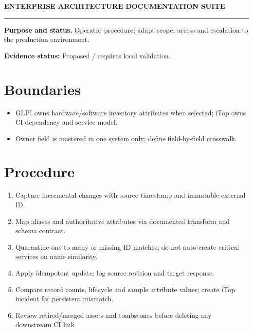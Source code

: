 \documentclass[10pt,letterpaper]{article}
\begin{document}
\begin{center}
{\large\bfseries\color{teal} ENTERPRISE ARCHITECTURE DOCUMENTATION SUITE}\par
{}\par
{}\par
\end{center}
\vspace{8pt}\hrule\vspace{12pt}
\textbf{Purpose and status.} Operator procedure; adapt scope, access and escalation to the production environment.\par
\textbf{Evidence status:} Proposed / requires local validation.\par
\section{Boundaries}
\begin{itemize}
\item GLPI owns hardware/software inventory attributes when selected; iTop owns CI dependency and service model.
\item Owner field is mastered in one system only; define field-by-field crosswalk.
\end{itemize}
\section{Procedure}
\begin{enumerate}
\item Capture incremental changes with source timestamp and immutable external ID.
\item Map aliases and authoritative attributes via documented transform and schema contract.
\item Quarantine one-to-many or missing-ID matches; do not auto-create critical services on name similarity.
\item Apply idempotent update; log source revision and target response.
\item Compare record counts, lifecycle and sample attribute values; create iTop incident for persistent mismatch.
\item Review retired/merged assets and tombstones before deleting any downstream CI link.
\end{enumerate}
\end{document}
